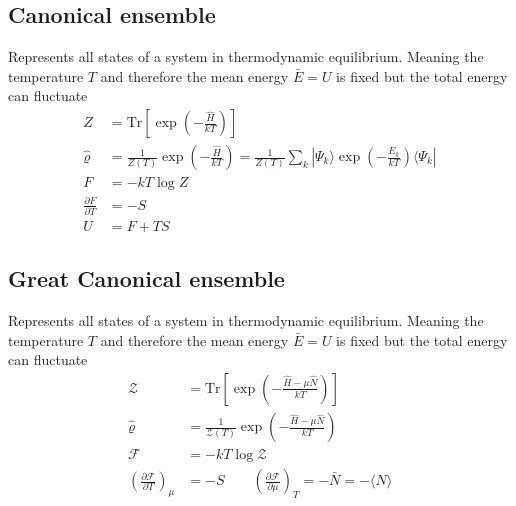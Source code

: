 \documentclass[10pt,a4paper]{book}
\theoremstyle{definition}
\begin{document}
\subsection{Canonical ensemble}
Represents all states of a system in thermodynamic equilibrium. Meaning the temperature $T$ and therefore the mean energy $\bar{E}=U$ is fixed but the total energy can fluctuate
\begin{align}
Z&=\text{Tr}\left[\exp\left(-\frac{\hat{H}}{kT}\right)\right]\\
\hat{\varrho}&=\frac{1}{Z(T)}\exp\left(-\frac{\hat{H}}{kT}\right)=\frac{1}{Z(T)}\sum_k|\Psi_k\rangle\exp\left(-\frac{E_k}{kT}\right)\langle\Psi_k|\\
F&=-kT\log Z\\
\frac{\partial F}{\partial T}&=-S\\
U&=F+TS
\end{align}

\subsection{Great Canonical ensemble}
Represents all states of a system in thermodynamic equilibrium. Meaning the temperature $T$ and therefore the mean energy $\bar{E}=U$ is fixed but the total energy can fluctuate
\begin{align}
\mathcal{Z}&=\text{Tr}\left[\exp\left(-\frac{\hat{H}-\mu\hat{N}}{kT}\right)\right]\\
\hat{\varrho}&=\frac{1}{\mathcal{Z}(T)}\exp\left(-\frac{\hat{H}-\mu\hat{N}}{kT}\right)\\
\mathcal{F}&=-kT\log \mathcal{Z}\\
\left(\frac{\partial \mathcal{F}}{\partial T}\right)_\mu&=-S
\qquad
\left(\frac{\partial \mathcal{F}}{\partial\mu}\right)_T=-\bar{N}=-\langle\hat{N}\rangle
\end{align}
\end{document}
